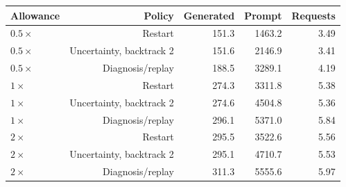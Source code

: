 \begin{tabular}{@{}lrrrr@{}}
\toprule
Allowance & Policy & Generated & Prompt & Requests \\
\midrule
$0.5\times$ & Restart & 151.3 & 1463.2 & 3.49 \\
$0.5\times$ & Uncertainty, backtrack 2 & 151.6 & 2146.9 & 3.41 \\
$0.5\times$ & Diagnosis/replay & 188.5 & 3289.1 & 4.19 \\
$1\times$ & Restart & 274.3 & 3311.8 & 5.38 \\
$1\times$ & Uncertainty, backtrack 2 & 274.6 & 4504.8 & 5.36 \\
$1\times$ & Diagnosis/replay & 296.1 & 5371.0 & 5.84 \\
$2\times$ & Restart & 295.5 & 3522.6 & 5.56 \\
$2\times$ & Uncertainty, backtrack 2 & 295.1 & 4710.7 & 5.53 \\
$2\times$ & Diagnosis/replay & 311.3 & 5555.6 & 5.97 \\
\bottomrule
\end{tabular}
